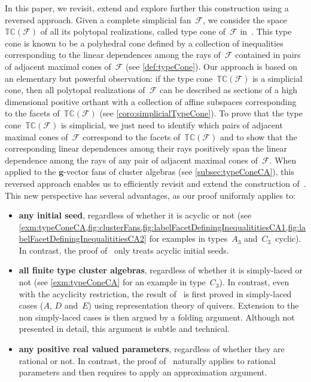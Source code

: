 \documentclass{amsart}
\theoremstyle{definition}
\renewcommand{\b}[1]{{\boldsymbol{#1}}} %
\newcommand{\Fan}{\mathcal{F}} %
\newcommand{\typeCone}{\mathbb{TC}} %
\begin{document}
\medskip
In this paper, we revisit, extend and explore further this construction using a reversed approach.
Given a complete simplicial fan~$\Fan$, we consider the space~$\typeCone(\Fan)$ of all its polytopal realizations, called type cone of~$\Fan$ in~\cite{McMullen-typeCone}.
This type cone is known to be a polyhedral cone defined by a collection of inequalities corresponding to the linear dependences among the rays of~$\Fan$ contained in pairs of adjacent maximal cones of~$\Fan$ (see \cref{def:typeCone}).
Our approach is based on an elementary but powerful observation: if the type cone~$\typeCone(\Fan)$ is a simplicial cone, then all polytopal realizations of~$\Fan$ can be described as sections of a high dimensional positive orthant with a collection of affine subspaces corresponding to the facets of~$\typeCone(\Fan)$ (see \cref{coro:simplicialTypeCone}).
To prove that the type cone~$\typeCone(\Fan)$ is simplicial, we just need to identify which pairs of adjacent maximal cones of~$\Fan$ correspond to the facets of~$\typeCone(\Fan)$ and to show that the corresponding linear dependences among their rays positively span the linear dependence among the rays of any pair of adjacent maximal cones of~$\Fan$.
When applied to the $\b{g}$-vector fans of cluster algebras (see \cref{subsec:typeConeCA}), this reversed approach enables us to efficiently revisit and extend the construction of~\cite{BazierMatteDouvilleMousavandThomasYildirim}.
This new perspective has several advantages, as our proof uniformly applies to:

\smallskip
\begin{itemize}
\item \textbf{any initial seed}, regardless of whether it is acyclic or not (see \cref{exm:typeConeCA,fig:clusterFans,fig:labelFacetDefiningInequalititiesCA1,fig:labelFacetDefiningInequalititiesCA2} for examples in types~$A_3$ and~$C_3$~cyclic). In contrast, the proof of~\cite{BazierMatteDouvilleMousavandThomasYildirim} only treats acyclic initial seeds.

\smallskip
\item \textbf{all finite type cluster algebras}, regardless of whether it is simply-laced or not (see \cref{exm:typeConeCA} for an example in type~$C_3$). In contrast, even with the acyclicity restriction, the result of~\cite{BazierMatteDouvilleMousavandThomasYildirim} is first proved in simply-laced cases ($A$, $D$ and~$E$) using representation theory of quivers. Extension to the non simply-laced cases is then argued by a folding argument. Although not presented in detail, this argument is subtle and technical.

\smallskip
\item \textbf{any positive real valued parameters}, regardless of whether they are rational or not. In contrast, the proof of~\cite{BazierMatteDouvilleMousavandThomasYildirim} naturally applies to rational parameters and then requires to apply an approximation argument.
\end{itemize}
\end{document}
